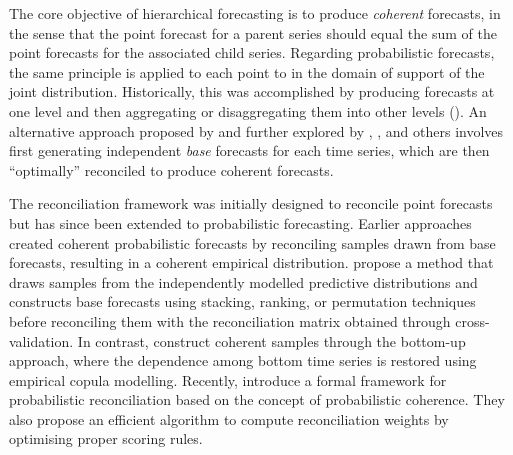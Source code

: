 \documentclass[a4paper,review,12pt,authoryear]{elsarticle}
\theoremstyle{definition}
\begin{document}
The core objective of hierarchical forecasting is to produce \textit{coherent} forecasts,
in the sense that the point forecast for a parent series should equal the sum of the point forecasts for the associated child series.
Regarding probabilistic forecasts, the same principle is applied to each point to in the domain of support of the joint distribution.
Historically, this was accomplished by producing forecasts at one level
and then aggregating or disaggregating them into other levels (\citealp{fliednerHierarchicalForecastingIssues2001}).
An alternative approach proposed by \cite{hyndmanOptimalCombinationForecasts2011} and further explored by \cite{wickramasuriyaOptimalForecastReconciliation2019}, \cite{ anagiotelisForecastReconciliationGeometric2021}, and others involves
first generating independent \textit{base} forecasts for each time series,
which are then ``optimally'' reconciled to produce coherent forecasts.

The reconciliation framework was initially designed to reconcile point forecasts but has since been extended to probabilistic forecasting.
Earlier approaches created coherent probabilistic forecasts by reconciling samples drawn from base forecasts, resulting in a coherent empirical distribution.
\cite{jeonProbabilisticForecastReconciliation2019} propose a method that draws samples from the independently modelled predictive distributions and constructs base forecasts using stacking, ranking, or permutation techniques before reconciling them with the reconciliation matrix obtained through cross-validation.
In contrast, \cite{bentaiebHierarchicalProbabilisticForecasting2020} construct coherent samples through the bottom-up approach,
where the dependence among bottom time series is restored using empirical copula modelling.
Recently, \cite{panagiotelisProbabilisticForecastReconciliation2022} introduce a formal framework for probabilistic reconciliation based on the concept of probabilistic coherence.
They also propose an efficient algorithm to compute reconciliation weights by optimising proper scoring rules.
\end{document}
